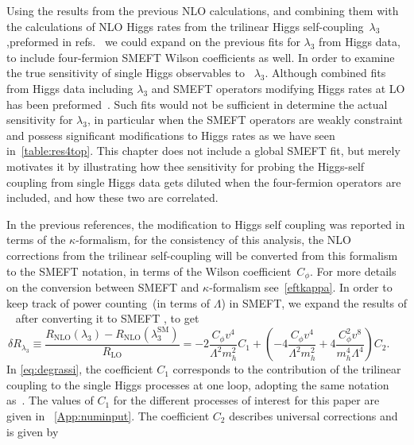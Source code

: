 \par Using the results from the previous NLO calculations, and combining them with the calculations of NLO Higgs rates from the trilinear Higgs self-coupling~$\lambda_3$,preformed in refs.~\cite{Gorbahn:2016uoy, Degrassi:2016wml, Bizon:2016wgr, Maltoni:2017ims, Degrassi:2021uik}  we could expand on the previous fits for $\lambda_3$ from Higgs data, to include four-fermion SMEFT Wilson coefficients as well. In order to examine the true sensitivity of single Higgs observables to ~$\lambda_3$.  
Although combined fits from Higgs data including $\lambda_3$ and SMEFT operators modifying Higgs rates at LO has been preformed~\cite{DiVita:2017eyz}. Such fits would not be sufficient in determine the actual sensitivity for $\lambda_3$, in particular when the SMEFT operators are weakly constraint and possess significant modifications to Higgs rates as we have seen in~\autoref{table:res4top}. This chapter does not include a global SMEFT fit, but merely motivates it by illustrating how thee sensitivity for probing the Higgs-self coupling from single Higgs data gets diluted when the four-fermion operators are included, and how these two are correlated. 
%
\par In the previous references, the modification to Higgs self coupling was reported in terms of the $\kappa$-formalism, for the consistency of this analysis, the NLO corrections from the trilinear self-coupling will be converted from this formalism to the SMEFT notation, in terms of the Wilson coefficient~$C_\phi$. For more details on the conversion between SMEFT and $\kappa$-formalism see~\autoref{eftkappa}. In order to keep track of power counting~(in terms of $\Lambda$) in SMEFT, we expand the results of ~\cite{Degrassi:2016wml} after converting it to SMEFT , to get
\begin{equation}
	\delta R_{\lambda_3}\equiv\frac{R_\mathrm{ NLO}(\lambda_3)-R_\mathrm{ NLO}(\lambda_3^\mathrm{{SM}})}{R_\mathrm{ LO}}=-2\frac{C_{\phi}v^4}{\Lambda^2 m_h^2}C_1 + \left(-4\frac{C_{\phi}v^4}{\Lambda^2 m_h^2}+4\frac{C_{\phi}^2 v^8}{m_h^4\Lambda^4}\right) C_2 . \;\;\;\;\;
	\label{eq:degrassi}
\end{equation}
%
In \eqref{eq:degrassi}, the coefficient $C_1$ corresponds to the contribution of the trilinear coupling to the single Higgs processes at one loop, adopting the same notation as~\cite{Degrassi:2016wml}. The values of $C_1$ for the different processes of interest for this paper are given in ~\autoref{App:numinput}. The coefficient $C_2$ describes universal corrections and is given by
